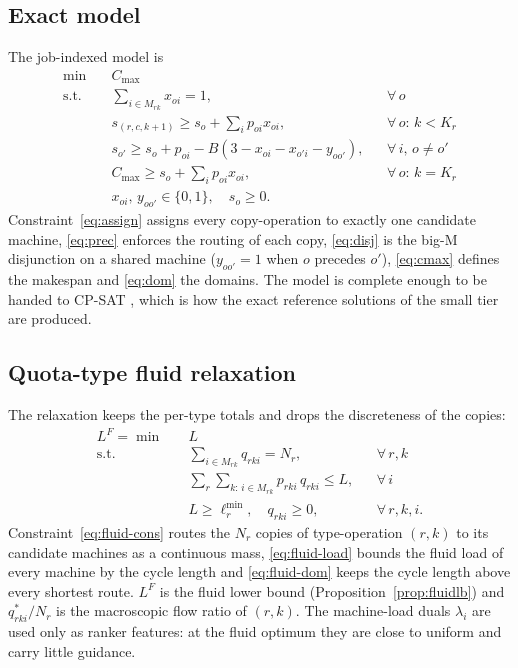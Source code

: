 \subsection{Exact model}\label{sec:model}
The job-indexed model is
\begin{align}
\min\quad & C_{\max} \label{eq:obj}\\
\text{s.t.}\quad & \textstyle\sum_{i \in M_{rk}} x_{oi} = 1, && \forall\, o \label{eq:assign}\\
& s_{(r,c,k+1)} \ge s_o + \textstyle\sum_{i} p_{oi} x_{oi}, && \forall\, o:\, k < K_r \label{eq:prec}\\
& s_{o'} \ge s_o + p_{oi} - B(3{-}x_{oi}{-}x_{o'i}{-}y_{oo'}), && \forall\,i,\,o{\ne}o' \label{eq:disj}\\
& C_{\max} \ge s_o + \textstyle\sum_{i} p_{oi} x_{oi}, && \forall\, o:\, k = K_r \label{eq:cmax}\\
& x_{oi},\, y_{oo'} \in \{0,1\},\quad s_o \ge 0. \label{eq:dom}
\end{align}
Constraint~\eqref{eq:assign} assigns every copy-operation to exactly one candidate machine, \eqref{eq:prec} enforces the
routing of each copy, \eqref{eq:disj} is the big-M disjunction on a shared machine ($y_{oo'} = 1$ when $o$ precedes $o'$),
\eqref{eq:cmax} defines the makespan and \eqref{eq:dom} the domains. The model is complete enough to be handed to CP-SAT
\cite{ortools}, which is how the exact reference solutions of the small tier are produced.

\subsection{Quota-type fluid relaxation}\label{sec:fluid}
The relaxation keeps the per-type totals and drops the discreteness of the copies:
\begin{align}
L^F = \min\quad & L \label{eq:fluid-obj}\\
\text{s.t.}\quad & \textstyle\sum_{i \in M_{rk}} q_{rki} = N_r, && \forall\, r, k \label{eq:fluid-cons}\\
& \textstyle\sum_{r}\sum_{k:\, i \in M_{rk}} p_{rki}\, q_{rki} \le L, && \forall\, i \label{eq:fluid-load}\\
& L \ge \ell_r^{\min},\quad q_{rki} \ge 0, && \forall\, r, k, i. \label{eq:fluid-dom}
\end{align}
Constraint~\eqref{eq:fluid-cons} routes the $N_r$ copies of type-operation $(r,k)$ to its candidate machines as a
continuous mass, \eqref{eq:fluid-load} bounds the fluid load of every machine by the cycle length and
\eqref{eq:fluid-dom} keeps the cycle length above every shortest route. $L^F$ is the fluid lower bound
(Proposition~\ref{prop:fluidlb}) and $q^*_{rki}/N_r$ is the macroscopic flow ratio of $(r,k)$. The machine-load duals
$\lambda_i$ are used only as ranker features: at the fluid optimum they are close to uniform and carry little guidance.

